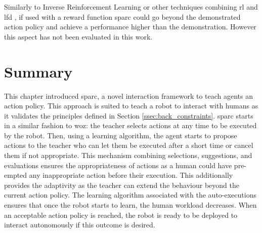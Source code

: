 Similarly to Inverse Reinforcement Learning \citep{abbeel2004apprenticeship} or other techniques combining \gls{rl} and \gls{lfd} \citep{billard2008robot}, if used with a reward function \gls{sparc} could go beyond the demonstrated action policy and achieve a performance higher than the demonstration. However this aspect has not been evaluated in this work.

\section{Summary}
    
This chapter introduced \acrfull{sparc}, a novel interaction framework to teach agents an action policy. This approach is suited to teach a robot to interact with humans as it validates the principles defined in Section \ref{ssec:back_constraints}. \gls{sparc} starts in a similar fashion to \gls{woz}: the teacher selects actions at any time to be executed by the robot. Then, using a learning algorithm, the agent starts to propose actions to the teacher who can let them be executed after a short time or cancel them if not appropriate. This mechanism combining selections, suggestions, and evaluations ensures the appropriateness of actions as a human could have pre-empted any inappropriate action before their execution. This additionally provides the adaptivity as the teacher can extend the behaviour beyond the current action policy. The learning algorithm associated with the auto-executions ensures that once the robot starts to learn, the human workload decreases. When an acceptable action policy is reached, the robot is ready to be deployed to interact autonomously if this outcome is desired.
